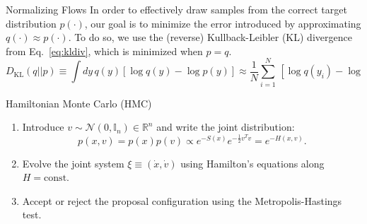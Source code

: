 \documentclass[final]{beamer}
\newlength{\colwidth}
\begin{document}
\begin{frame}[t]
\begin{columns}[t]
\begin{column}{\colwidth}
\begin{block}{Normalizing Flows}
    In order to effectively draw samples from the correct target distribution \(p(\cdot)\), our goal is to minimize the
    error introduced by approximating \(q(\cdot) \approx p(\cdot)\).
    To do so, we use the (reverse) Kullback-Leibler (KL) divergence from Eq.~\ref{eq:kldiv}, which is minimized when \(p
    = q\).
    \begin{equation}
      D_{\mathrm{KL}}(q||p) 
        \equiv \int dy\, q(y)[\log q(y) - \log p(y)]
        \approx \frac{1}{N} \sum_{i=1}^{N} \,[\log q(y_{i}) - \log p(y_{i})]\quad\text{where}\quad y_{i}\sim q.
        \label{eq:kldiv}
    \end{equation}
  \end{block}

  \begin{block}{Hamiltonian Monte Carlo (HMC)}
      \begin{enumerate}
        \item Introduce \(v \sim \mathcal{N}(0, \mathbb{I}_{n})\in \mathbb{R}^{n}\) and write the joint distribution:
          \begin{equation}
            p(x, v) = p(x) p(v)\propto e^{-S(x)}e^{-\frac{1}{2}v^{T}v} = e^{-H(x, v)}.
          \end{equation}
        \item Evolve the joint system \(\xi \equiv (\dot x, \dot v)\) using Hamilton's equations along
          \(H=\mathrm{const}\).
        \item Accept or reject the proposal configuration using the Metropolis-Hastings test.
      \end{enumerate}


\end{block}
\end{column}
\end{columns}
\end{frame}
\end{document}
